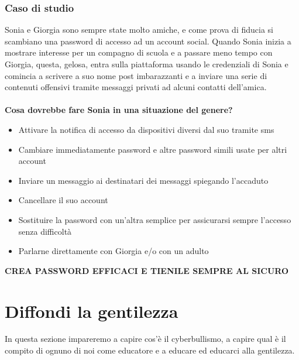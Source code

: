 \documentclass{article}
\begin{document}
\subsubsection{Caso di studio}
\label{sec:Caso16}
Sonia e Giorgia sono sempre state molto amiche, e come prova di fiducia si scambiano una password di accesso ad un account social. Quando Sonia inizia a mostrare interesse per un compagno di scuola e a passare meno tempo con Giorgia, questa, gelosa, entra sulla piattaforma usando le credenziali di Sonia e comincia a scrivere a suo nome post imbarazzanti e a inviare una serie di contenuti offensivi tramite messaggi privati ad alcuni contatti dell’amica.
\\\vspace{5mm}\\
\textbf{Cosa dovrebbe fare Sonia in una situazione del genere?}
\begin{itemize}
	\item Attivare la notifica di accesso da dispositivi diversi dal suo tramite sms
	\item Cambiare immediatamente password e altre password simili usate per altri account
	\item Inviare un messaggio ai destinatari dei messaggi spiegando l’accaduto
	\item Cancellare il suo account
	\item Sostituire la password con un’altra semplice per assicurarsi sempre l’accesso senza difficoltà
	\item Parlarne direttamente con Giorgia e/o con un adulto
\end{itemize}
\begin{center}
	\begin{huge}
		\textbf{CREA PASSWORD EFFICACI E TIENILE SEMPRE AL SICURO}
	\end{huge}
\end{center}
\pagebreak
\section{Diffondi la gentilezza}
In questa sezione impareremo a capire cos'è il cyberbullismo, a capire qual è il compito di ognuno di noi come educatore e a educare ed educarci alla gentilezza.
\end{document}
